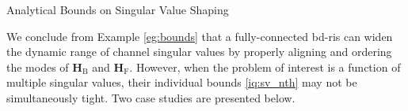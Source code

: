 \begin{section}{Analytical Bounds on Singular Value Shaping}
\begin{example}

	\end{example}

	We conclude from Example \ref{eg:bounds} that a fully-connected \gls{bd}-\gls{ris} can widen the dynamic range of channel singular values by properly aligning and ordering the modes of $\mathbf{H}_\mathrm{B}$ and $\mathbf{H}_\mathrm{F}$.
	However, when the problem of interest is a function of multiple singular values, their individual bounds \eqref{iq:sv_nth} may not be simultaneously tight.
	Two case studies are presented below.


\end{section}
